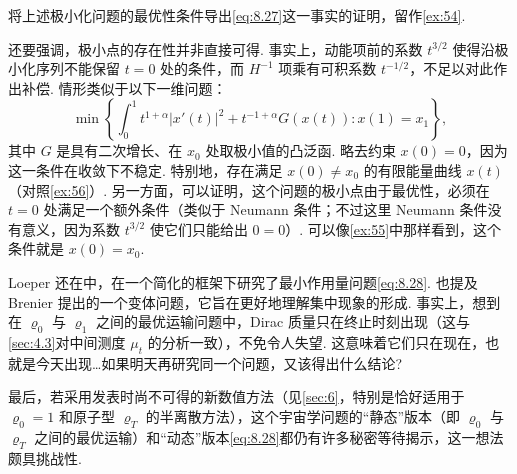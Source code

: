 将上述极小化问题的最优性条件导出\eqref{eq:8.27}这一事实的证明，留作\autoref{ex:54}.

还要强调，极小点的存在性并非直接可得. 事实上，动能项前的系数 $t^{3/2}$ 使得沿极小化序列不能保留 $t=0$ 处的条件，而 $H^{-1}$ 项乘有可积系数 $t^{-1/2}$，不足以对此作出补偿. 情形类似于以下一维问题：
\[
\min\left\{\int_0^1t^{1+\alpha}|x'(t)|^2+t^{-1+\alpha}G(x(t)):x(1)=x_1\right\},
\]
其中 $G$ 是具有二次增长、在 $x_0$ 处取极小值的凸泛函. 略去约束 $x(0)=0$，因为这一条件在收敛下不稳定. 特别地，存在满足 $x(0)\neq x_0$ 的有限能量曲线 $x(t)$（对照\autoref{ex:56}）. 另一方面，可以证明，这个问题的极小点由于最优性，必须在 $t=0$ 处满足一个额外条件（类似于 Neumann 条件；不过这里 Neumann 条件没有意义，因为系数 $t^{3/2}$ 使它们只能给出 $0=0$）. 可以像\autoref{ex:55}中那样看到，这个条件就是 $x(0)=x_0$.

Loeper 还在\cite{b215}中，在一个简化的框架下研究了最小作用量问题\eqref{eq:8.28}. 也提及 Brenier 提出的一个变体问题，它旨在更好地理解集中现象的形成\cite{b87}. 事实上，想到在 $\varrho_0$ 与 $\varrho_1$ 之间的最优运输问题中，Dirac 质量只在终止时刻出现（这与\autoref{sec:4.3}对中间测度 $\mu_t$ 的分析一致），不免令人失望. 这意味着它们只在现在，也就是今天出现\ldots{}如果明天再研究同一个问题，又该得出什么结论?

最后，若采用\cite{b89}发表时尚不可得的新数值方法（见\autoref{sec:6}，特别是恰好适用于 $\varrho_0=1$ 和原子型 $\varrho_T$ 的半离散方法），这个宇宙学问题的“静态”版本（即 $\varrho_0$ 与 $\varrho_T$ 之间的最优运输）和“动态”版本\eqref{eq:8.28}都仍有许多秘密等待揭示，这一想法颇具挑战性.
